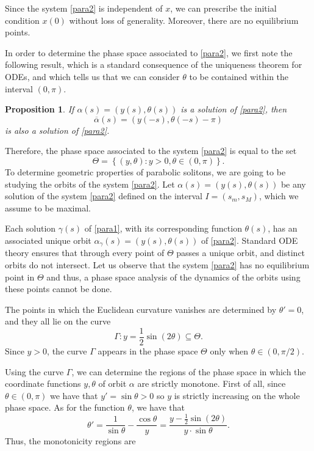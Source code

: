 \documentclass[12pt]{amsart}
\theoremstyle{plain}
\newtheorem{proposition}[theorem]{Proposition}
\theoremstyle{definition}
\begin{document}
Since the system \eqref{para2} is   independent of $x$,   we can prescribe the initial condition $x(0)$ without loss of generality. Moreover, there are no equilibrium points.

In order to determine the phase space associated to \eqref{para2}, we first note the following result, which is a standard consequence of the uniqueness theorem for ODEs,  and which tells us that we can consider $\theta$ to be contained within the interval $(0,\pi)$.

\begin{proposition}\label{pr52}
If $\alpha(s) = (y(s),\theta(s))$ is a solution of \eqref{para2}, then  $$\overline{\alpha}(s) = (y(-s),\theta(-s) - \pi)$$ is also a solution of \eqref{para2}. 
\end{proposition}

Therefore, the phase space associated to the system \eqref{para2} is equal to the set 
$$\Theta = \left \{ (y, \theta) \colon y > 0, \theta \in (0,\pi) \right\}.$$
To determine geometric properties of parabolic solitons, we are going to be studying the orbits of the system \eqref{para2}. Let $\alpha(s) = (y(s), \theta(s))$ be any solution of the system \eqref{para2} defined on the interval $I = (s_m, s_M)$, which we assume to be maximal.

Each solution $\gamma(s)$ of \eqref{para1}, with its corresponding function $\theta(s)$,  has an associated unique orbit $\alpha_\gamma(s)= (y(s),\theta(s))$ of \eqref{para2}. Standard ODE theory ensures that through every point of $\Theta$ passes a unique orbit, and distinct orbits do not intersect. 
Let us observe that the system \eqref{para2} has no equilibrium point in $\Theta$ and thus, a phase space analysis of the dynamics of the orbits using these points cannot be done.






The points in which the Euclidean curvature vanishes are determined by $\theta' = 0$, and they all lie on the curve 
$$\Gamma\colon y = \frac{1}{2} \sin(2\theta) \subseteq \Theta.$$
 Since $y>0$, the curve $\Gamma$ appears in the phase space $\Theta$ only when $\theta \in (0, \pi/2)$.

Using the curve $\Gamma$, we can determine the regions of the phase space in which the coordinate functions $y,\theta$ of orbit $\alpha$ are strictly monotone. First of all, since $\theta \in (0, \pi)$ we have that $y' = \sin \theta > 0$ so $y$ is strictly increasing on the whole phase space. As for the function $\theta$, we have that
$$\theta' = \frac{1}{\sin\theta} - \frac{\cos\theta}{y} = \frac{y-\frac{1}{2}\sin(2\theta)}{y\cdot \sin\theta}.$$
Thus, the monotonicity regions are
\end{document}
